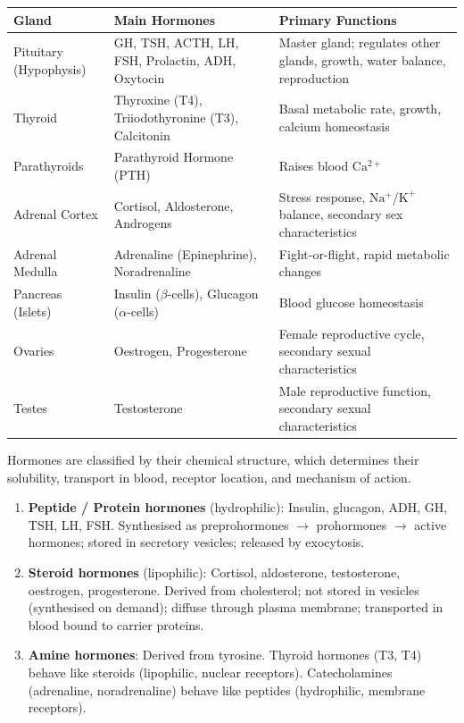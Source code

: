\documentclass[11pt]{article}
\newcounter{popsec}
\newcounter{popsub}
\newcommand{\courssub}[1]{%
  \stepcounter{popsub}%
  \par\vspace{9pt}\noindent{\popxbold\fontsize{11.5}{13}\selectfont\color{popink}{\color{poporange}\thepopsec.\thepopsub}\hspace{6pt}#1}\par\nopagebreak\vspace{4pt}
}
\begin{document}
\begin{aretenir}
\begin{center}
\begin{tabularx}{\linewidth}{|l|X|X|}\hline
\rowcolor{popblueL}
\textbf{Gland} & \textbf{Main Hormones} & \textbf{Primary Functions} \\ \hline
Pituitary (Hypophysis) & GH, TSH, ACTH, LH, FSH, Prolactin, ADH, Oxytocin & Master gland; regulates other glands, growth, water balance, reproduction \\ \hline
Thyroid & Thyroxine (T4), Triiodothyronine (T3), Calcitonin & Basal metabolic rate, growth, calcium homeostasis \\ \hline
Parathyroids & Parathyroid Hormone (PTH) & Raises blood $\mathrm{Ca^{2+}}$ \\ \hline
Adrenal Cortex & Cortisol, Aldosterone, Androgens & Stress response, $\mathrm{Na^+}$/$\mathrm{K^+}$ balance, secondary sex characteristics \\ \hline
Adrenal Medulla & Adrenaline (Epinephrine), Noradrenaline & Fight-or-flight, rapid metabolic changes \\ \hline
Pancreas (Islets) & Insulin ($\beta$-cells), Glucagon ($\alpha$-cells) & Blood glucose homeostasis \\ \hline
Ovaries & Oestrogen, Progesterone & Female reproductive cycle, secondary sexual characteristics \\ \hline
Testes & Testosterone & Male reproductive function, secondary sexual characteristics \\ \hline
\end{tabularx}
\end{center}
\end{aretenir}

\courssub{Chemical Nature of Hormones}

Hormones are classified by their chemical structure, which determines their solubility, transport in blood, receptor location, and mechanism of action.

\begin{propriete}
\begin{enumerate}
    \item \textbf{Peptide / Protein hormones} (hydrophilic): Insulin, glucagon, ADH, GH, TSH, LH, FSH. Synthesised as preprohormones $\rightarrow$ prohormones $\rightarrow$ active hormones; stored in secretory vesicles; released by exocytosis.
    \item \textbf{Steroid hormones} (lipophilic): Cortisol, aldosterone, testosterone, oestrogen, progesterone. Derived from cholesterol; not stored in vesicles (synthesised on demand); diffuse through plasma membrane; transported in blood bound to carrier proteins.
    \item \textbf{Amine hormones}: Derived from tyrosine. Thyroid hormones (T3, T4) behave like steroids (lipophilic, nuclear receptors). Catecholamines (adrenaline, noradrenaline) behave like peptides (hydrophilic, membrane receptors).
\end{enumerate}
\end{propriete}
\end{document}
